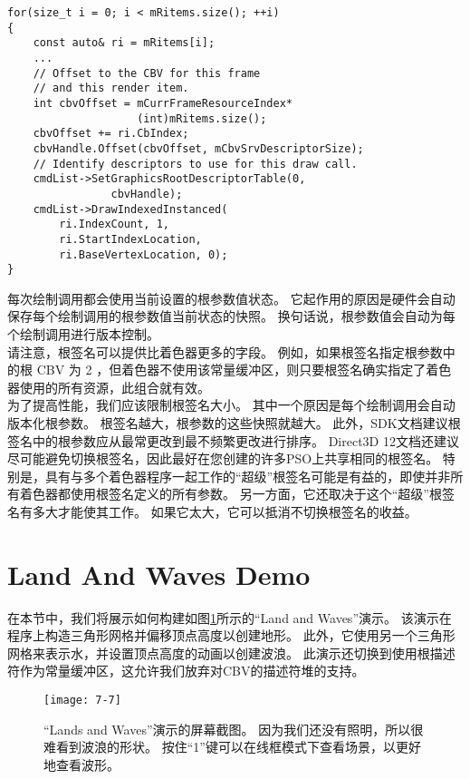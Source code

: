 \begin{lstlisting}
for(size_t i = 0; i < mRitems.size(); ++i)
{
    const auto& ri = mRitems[i];
    ...
    // Offset to the CBV for this frame 
    // and this render item.
    int cbvOffset = mCurrFrameResourceIndex*
                    (int)mRitems.size();
    cbvOffset += ri.CbIndex;
    cbvHandle.Offset(cbvOffset, mCbvSrvDescriptorSize);
    // Identify descriptors to use for this draw call.
    cmdList->SetGraphicsRootDescriptorTable(0,
                cbvHandle);
    cmdList->DrawIndexedInstanced(
        ri.IndexCount, 1,
        ri.StartIndexLocation,
        ri.BaseVertexLocation, 0);
}
\end{lstlisting}

\begin{flushleft}
每次绘制调用都会使用当前设置的根参数值状态。 它起作用的原因是硬件会自动保存每个绘制调用的根参数值当前状态的快照。 换句话说，根参数值会自动为每个绘制调用进行版本控制。\\
请注意，根签名可以提供比着色器更多的字段。 例如，如果根签名指定根参数中的根 CBV 为 2 ，但着色器不使用该常量缓冲区，则只要根签名确实指定了着色器使用的所有资源，此组合就有效。\\
为了提高性能，我们应该限制根签名大小。 其中一个原因是每个绘制调用会自动版本化根参数。 根签名越大，根参数的这些快照就越大。 此外，SDK文档建议根签名中的根参数应从最常更改到最不频繁更改进行排序。 Direct3D 12文档还建议尽可能避免切换根签名，因此最好在您创建的许多PSO上共享相同的根签名。 特别是，具有与多个着色器程序一起工作的“超级”根签名可能是有益的，即使并非所有着色器都使用根签名定义的所有参数。 另一方面，它还取决于这个“超级”根签名有多大才能使其工作。 如果它太大，它可以抵消不切换根签名的收益。
\end{flushleft}


\section{Land And Waves Demo}
\begin{flushleft}
在本节中，我们将展示如何构建如图\ref{fig:7-7}所示的“Land and Waves”演示。 该演示在程序上构造三角形网格并偏移顶点高度以创建地形。 此外，它使用另一个三角形网格来表示水，并设置顶点高度的动画以创建波浪。 此演示还切换到使用根描述符作为常量缓冲区，这允许我们放弃对CBV的描述符堆的支持。
\end{flushleft}
\begin{figure}[h]
    \texttt{[image: 7-7]}
    \centering
    \caption{“Lands and Waves”演示的屏幕截图。 因为我们还没有照明，所以很难看到波浪的形状。 按住“1”键可以在线框模式下查看场景，以更好地查看波形。}
    \label{fig:7-7}
\end{figure}
\clearpage

